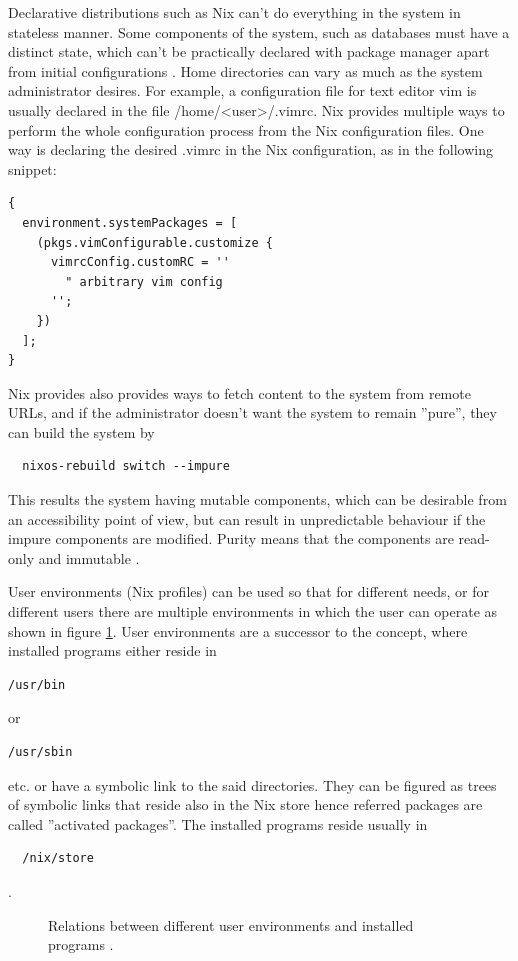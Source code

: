 Declarative distributions such as Nix can't do everything in the
system in stateless manner. Some components of the system, such as
databases must have a distinct state, which can't be practically
declared with package manager apart from initial configurations
\cite{van2013reference}. Home directories can vary as much as the
system administrator desires. For example, a configuration file for
text editor vim is usually declared in the file
/home/<user>/.vimrc. Nix provides multiple ways to perform the whole
configuration process from the Nix configuration files. One way is
declaring the desired .vimrc in the Nix configuration, as in the
following snippet:

\begin{lstlisting}
{
  environment.systemPackages = [
    (pkgs.vimConfigurable.customize {
      vimrcConfig.customRC = ''
        " arbitrary vim config
      '';
    })
  ];
}
\end{lstlisting}
Nix provides also provides ways to fetch content to the system from
remote URLs, and if the administrator doesn't want the system to
remain ''pure'', they can build the system by
\begin{lstlisting}
  nixos-rebuild switch --impure
\end{lstlisting}
This results the system having mutable components, which can be
desirable from an accessibility point of view, but can result in
unpredictable behaviour if the impure components are modified. Purity means that the components are read-only and
immutable \cite{dolstra2010nixos}.

User environments (Nix profiles) can be used so that for different
needs, or for different users there are multiple environments in which
the user can operate as shown in figure \ref{userenvs}. User
environments are a successor to the concept, where installed programs
either reside in
\begin{lstlisting}
/usr/bin
\end{lstlisting}
or
\begin{lstlisting}
/usr/sbin
\end{lstlisting}
etc. or have a symbolic link to
the said directories. They can be figured as trees of symbolic links
that reside also in the Nix store hence referred packages are called
''activated packages''. The installed programs reside usually in
\begin{lstlisting}
  /nix/store
\end{lstlisting}. \cite{dolstra2008nixos}

\begin{figure}[t!]
\centerline{}
\caption{Relations between different user environments and installed
  programs \cite{nixosUserEnvironment}.}
\label{userenvs}
\end{figure}

